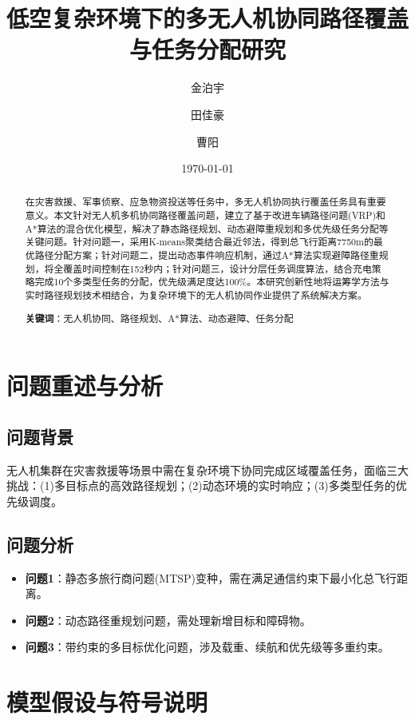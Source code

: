\documentclass[12pt,fontset=adobe]{ctexart}
\title{低空复杂环境下的多无人机协同路径覆盖与任务分配研究}
\author{金泊宇\and 田佳豪 \and 曹阳}
\date{\today}
\begin{document}

\begin{abstract}
  在灾害救援、军事侦察、应急物资投送等任务中，多无人机协同执行覆盖任务具有重要意义。本文针对无人机多机协同路径覆盖问题，建立了基于改进车辆路径问题(VRP)和A*算法的混合优化模型，解决了静态路径规划、动态避障重规划和多优先级任务分配等关键问题。针对问题一，采用K-means聚类结合最近邻法，得到总飞行距离7750m的最优路径分配方案；针对问题二，提出动态事件响应机制，通过A*算法实现避障路径重规划，将全覆盖时间控制在152秒内；针对问题三，设计分层任务调度算法，结合充电策略完成10个多类型任务的分配，优先级满足度达100\%。本研究创新性地将运筹学方法与实时路径规划技术相结合，为复杂环境下的无人机协同作业提供了系统解决方案。

  \textbf{关键词}：无人机协同、路径规划、A*算法、动态避障、任务分配
\end{abstract}



\section{问题重述与分析}

\subsection{问题背景}
无人机集群在灾害救援等场景中需在复杂环境下协同完成区域覆盖任务，面临三大挑战：(1)多目标点的高效路径规划；(2)动态环境的实时响应；(3)多类型任务的优先级调度。

\subsection{问题分析}
\begin{itemize}
  \item \textbf{问题1}：静态多旅行商问题(MTSP)变种，需在满足通信约束下最小化总飞行距离。
  \item \textbf{问题2}：动态路径重规划问题，需处理新增目标和障碍物。
  \item \textbf{问题3}：带约束的多目标优化问题，涉及载重、续航和优先级等多重约束。
\end{itemize}

\section{模型假设与符号说明}
\end{document}

